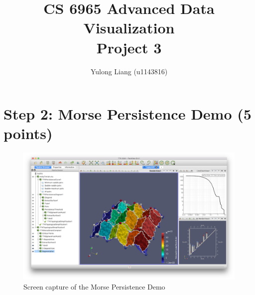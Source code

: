 \documentclass[12pt]{article}
\begin{document}
\title{CS 6965 Advanced Data Visualization\\{\bf Project 3}}
\author{Yulong Liang (u1143816)}
\maketitle

\section*{Step 2: Morse Persistence Demo (5 points)}

\begin{figure}[h]
\centering
\includegraphics[width=1\linewidth]{3.png}
\caption{Screen capture of the Morse Persistence Demo}
\label{fig:name}
\end{figure}
\end{document}
